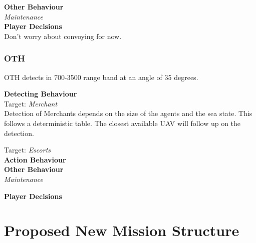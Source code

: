\documentclass{article}
\begin{document}
    \noindent \textbf{Other Behaviour} \\
        \noindent \textit{Maintenance} \\
        
    \noindent \textbf{Player Decisions} \\

Don't worry about convoying for now.

\subsubsection{OTH}
OTH detects in 700-3500 range band at an angle of 35 degrees.

    \noindent \textbf{Detecting Behaviour} \\

        \noindent Target: \textit{Merchant} \\
        Detection of Merchants depends on the size of the agents and the sea state. This follows a deterministic table. The closest available UAV will follow up on the detection. 

        \noindent Target: \textit{Escorts} \\
  

    \noindent \textbf{Action Behaviour} \\


    \noindent \textbf{Other Behaviour} \\
        \noindent \textit{Maintenance}
        
    \noindent \textbf{Player Decisions} \\



\section{Proposed New Mission Structure}
\end{document}
